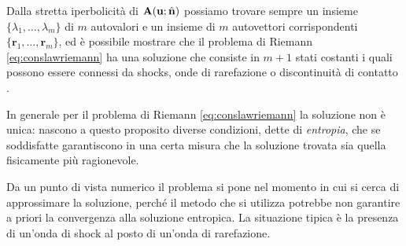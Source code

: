 Dalla stretta iperbolicità di $\mathbf{A}(\mathbf{u};\hat{\mathbf{n}})$ possiamo trovare sempre un insieme $\bigl\{ \lambda_1, \ldots, \lambda_m \bigr\}$  di $m$ autovalori e un insieme di $m$ autovettori corrispondenti $\bigl\{ \mathbf{r}_1, \ldots, \mathbf{r}_m \bigr\}$, ed è possibile mostrare che il problema di Riemann \eqref{eq:conslawriemann} ha una soluzione che consiste in $m+1$ stati costanti i quali possono essere connessi da shocks, onde di rarefazione o discontinuità di contatto \cite{Kroner97}.

In generale per il problema di Riemann \eqref{eq:conslawriemann} la soluzione non è unica: nascono a questo proposito diverse condizioni, dette di \emph{entropia}, che se soddisfatte garantiscono in una certa misura che la soluzione trovata sia quella fisicamente più ragionevole.

Da un punto di vista numerico il problema si pone nel momento in cui si cerca di approssimare la soluzione, perché il metodo che si utilizza potrebbe non garantire a priori la convergenza alla soluzione entropica. La situazione tipica è la presenza di un'onda di shock al posto di un'onda di rarefazione.